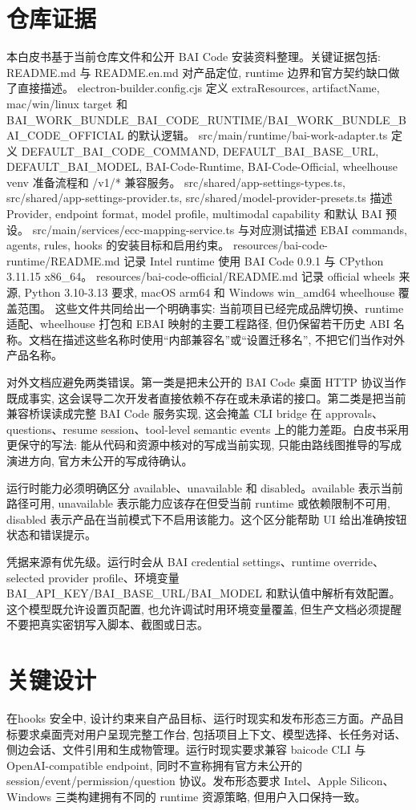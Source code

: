 \section{仓库证据}
本白皮书基于当前仓库文件和公开 BAI Code 安装资料整理。关键证据包括: README.md 与 README.en.md 对产品定位, runtime 边界和官方契约缺口做了直接描述。 electron-builder.config.cjs 定义 extraResources, artifactName, mac/win/linux target 和 BAI\_WORK\_BUNDLE\_BAI\_CODE\_RUNTIME/BAI\_WORK\_BUNDLE\_BAI\_CODE\_OFFICIAL 的默认逻辑。 src/main/runtime/bai-work-adapter.ts 定义 DEFAULT\_BAI\_CODE\_COMMAND, DEFAULT\_BAI\_BASE\_URL, DEFAULT\_BAI\_MODEL, BAI-Code-Runtime, BAI-Code-Official, wheelhouse venv 准备流程和 /v1/* 兼容服务。 src/shared/app-settings-types.ts, src/shared/app-settings-provider.ts, src/shared/model-provider-presets.ts 描述 Provider, endpoint format, model profile, multimodal capability 和默认 BAI 预设。 src/main/services/ecc-mapping-service.ts 与对应测试描述 EBAI commands, agents, rules, hooks 的安装目标和启用约束。 resources/bai-code-runtime/README.md 记录 Intel runtime 使用 BAI Code 0.9.1 与 CPython 3.11.15 x86\_64。 resources/bai-code-official/README.md 记录 official wheels 来源, Python 3.10-3.13 要求, macOS arm64 和 Windows win\_amd64 wheelhouse 覆盖范围。 这些文件共同给出一个明确事实: 当前项目已经完成品牌切换、runtime 适配、wheelhouse 打包和 EBAI 映射的主要工程路径, 但仍保留若干历史 ABI 名称。文档在描述这些名称时使用“内部兼容名”或“设置迁移名”, 不把它们当作对外产品名称。

对外文档应避免两类错误。第一类是把未公开的 BAI Code 桌面 HTTP 协议当作既成事实, 这会误导二次开发者直接依赖不存在或未承诺的接口。第二类是把当前兼容桥误读成完整 BAI Code 服务实现, 这会掩盖 CLI bridge 在 approvals、questions、resume session、tool-level semantic events 上的能力差距。白皮书采用更保守的写法: 能从代码和资源中核对的写成当前实现, 只能由路线图推导的写成演进方向, 官方未公开的写成待确认。

运行时能力必须明确区分 available、unavailable 和 disabled。available 表示当前路径可用, unavailable 表示能力应该存在但受当前 runtime 或依赖限制不可用, disabled 表示产品在当前模式下不启用该能力。这个区分能帮助 UI 给出准确按钮状态和错误提示。

凭据来源有优先级。运行时会从 BAI credential settings、runtime override、selected provider profile、环境变量 BAI\_API\_KEY/BAI\_BASE\_URL/BAI\_MODEL 和默认值中解析有效配置。这个模型既允许设置页配置, 也允许调试时用环境变量覆盖, 但生产文档必须提醒不要把真实密钥写入脚本、截图或日志。

\section{关键设计}
在hooks 安全中, 设计约束来自产品目标、运行时现实和发布形态三方面。产品目标要求桌面壳对用户呈现完整工作台, 包括项目上下文、模型选择、长任务对话、侧边会话、文件引用和生成物管理。运行时现实要求兼容 baicode CLI 与 OpenAI-compatible endpoint, 同时不宣称拥有官方未公开的 session/event/permission/question 协议。发布形态要求 Intel、Apple Silicon、Windows 三类构建拥有不同的 runtime 资源策略, 但用户入口保持一致。

